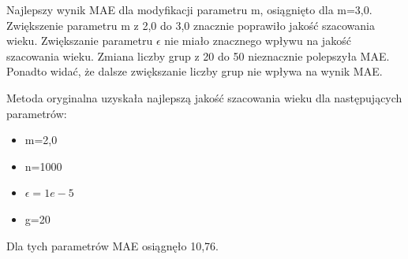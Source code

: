 \documentclass[a4paper,twoside,12pt]{book}
\begin{document}
    Najlepszy wynik MAE dla modyfikacji parametru m, osiągnięto dla m=3,0. Zwiększenie parametru m z 2,0 do 3,0
    znacznie poprawiło jakość szacowania wieku.
    Zwiększanie parametru $\epsilon$ nie miało znacznego wpływu na jakość szacowania wieku.
    Zmiana liczby grup z 20 do 50 nieznacznie polepszyła MAE. Ponadto widać, że dalsze zwiększanie liczby grup nie
    wpływa na wynik MAE.

    Metoda oryginalna uzyskała najlepszą jakość szacowania wieku dla następujących parametrów:
    \begin{itemize}
        \item m=2,0
        \item n=1000
        \item $\epsilon=1e-5$
        \item g=20
    \end{itemize}
    Dla tych parametrów MAE osiągnęło 10,76.
\end{document}
